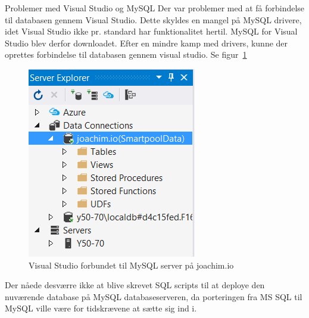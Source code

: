 Problemer med Visual Studio og MySQL
Der var problemer med at få forbindelse til databasen gennem Visual Studio. Dette skyldes en mangel på MySQL drivere, idet Visual Studio ikke pr. standard har funktionalitet hertil. MySQL for Visual Studio blev derfor downloadet\cite{oracle}. Efter en mindre kamp med drivers, kunne der oprettes forbindelse til databasen gennem visual studio. Se figur~\ref{fig:MySQLforsog}

\begin{figure}
\centering
\includegraphics[width=0.3\linewidth]{figs/database/MySQLforsog.PNG}
\caption{Visual Studio forbundet til MySQL server på joachim.io}
\label{fig:MySQLforsog}
\end{figure}

Der nåede desværre ikke at blive skrevet SQL scripts til at deploye den nuværende database på MySQL databaseserveren, da porteringen fra MS SQL til MySQL ville være for tidskrævene at sætte sig ind i. 






